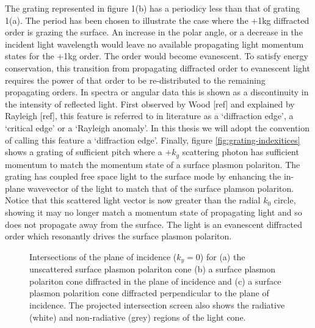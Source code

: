 \documentclass[oneside,10pt,a4paper]{book}
\begin{document}
The grating represented in figure 1(b) has a periodicy less than that of grating 1(a). The period has been chosen to illustrate the case where the +1kg diffracted order is grazing the surface. An increase in the polar angle, or a decrease in the incident light wavelength would leave no available propagating light momentum states for the +1kg order. The order would become evanescent. To satisfy energy conservation, this transition from propagating diffracted order to evanescent light requires the power of that order to be re-distributed to the remaining propagating orders. In spectra or angular data this is shown as a discontinuity in the intensity of reflected light. First observed by Wood [ref] and explained by Rayleigh [ref], this feature is referred to in literature as a ‘diffraction edge’, a ‘critical edge’ or a ‘Rayleigh anomaly’.  In this thesis we will adopt the convention of calling this feature a ‘diffraction edge’.
Finally, figure \ref{fig:grating-indexitices} shows a grating of sufficient pitch where a $+k_g$ scattering photon has sufficient momentum to match the momentum state of a surface plasmon polariton. The grating has coupled free space light to the surface mode by enhancing the in-plane wavevector of the light to match that of the surface plamson polariton. Notice that this scattered light vector is now greater than the radial $k_0$ circle, showing it may no longer match a momentum state of propagating light and so does not propagate away from the surface. The light is an evanescent diffracted order which resonantly drives the surface plasmon polariton.

\begin{figure}
\centering
		\begin{subfigure}[]{0.48\textwidth}
		\centering
		\end{subfigure}
		\begin{subfigure}[]{0.48\textwidth}
		\centering
		\end{subfigure}
		\begin{subfigure}[]{0.48\textwidth}
		\centering	
		\end{subfigure}
	\caption{Intersections of the plane of incidence ($k_y = 0$) for (a) the unscattered surface plasmon polariton cone (b) a surface plasmon polariton cone diffracted in the plane of incidence and (c) a surface plasmon polarition cone diffracted perpendicular to the plane of incidence.\label{fig:plasmon-intersections} The projected intersection screen also shows the radiative (white) and non-radiative (grey) regions of the light cone.}
\end{figure}
\end{document}
